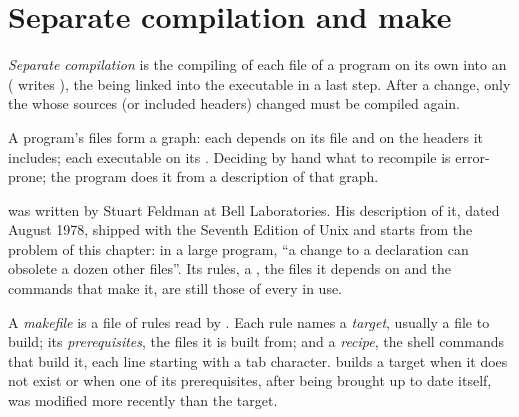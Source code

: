 \section{Separate compilation and make}\label{sec:b1:c-modules-make-tests:make}

\begin{definition}\label{def:b1:c-modules-make-tests:separate}
\emph{Separate compilation} is the compiling of each  file of a program on its own
into an  ( writes ), the  being linked into the executable
in a last step. After a change, only the  whose sources (or included headers) changed must be compiled
again.
\end{definition}

A program's files form a graph: each  depends on its  file and on the headers it includes; each
executable on its . Deciding by hand what to recompile is error-prone; the program  does it from
a description of that graph.

\begin{history}
 was written by Stuart Feldman at Bell Laboratories. His description of it, dated August 1978, shipped
with the Seventh Edition of Unix and starts from the problem of this chapter: in a large program, ``a change to a
declaration can obsolete a dozen other files''. Its rules, a , the files it depends on and the commands that
make it, are still those of every  in use.
\end{history}

\begin{definition}\label{def:b1:c-modules-make-tests:makefile}
A \emph{makefile} is a file of rules read by . Each rule names a
\emph{target}, usually a file to build; its \emph{prerequisites}, the
files it is built from; and a \emph{recipe}, the shell commands that build it, each line starting with a
tab character.  builds a target when it does not exist or when one of its prerequisites, after being brought
up to date itself, was modified more recently than the target.
\end{definition}

